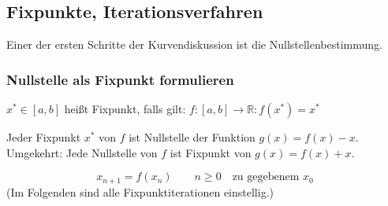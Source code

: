 \subsection{Fixpunkte, Iterationsverfahren}
Einer der ersten Schritte der Kurvendiskussion ist die Nullstellenbestimmung.

\subsubsection*{Nullstelle als Fixpunkt formulieren}

\begin{definition}
	$x^* \in [a, b]$ heißt Fixpunkt, falls gilt: $f: [a, b] \rightarrow \mathbb{R}: f(x^*) = x^*$
\end{definition}
\begin{lemma}
	Jeder Fixpunkt $x^*$ von $f$ ist Nullstelle der Funktion $g(x) = f(x) - x$. \\
	Umgekehrt: Jede Nullstelle von $f$ ist Fixpunkt von $g(x) = f(x) + x$.
\end{lemma}
\begin{definition}\flush
	\begin{equation*}
		x_{n + 1} = f(x_n) \qquad n \geq 0 \quad \text{zu gegebenem $x_0$}
	\end{equation*}
	(Im Folgenden sind alle Fixpunktiterationen einstellig.)
\end{definition}

